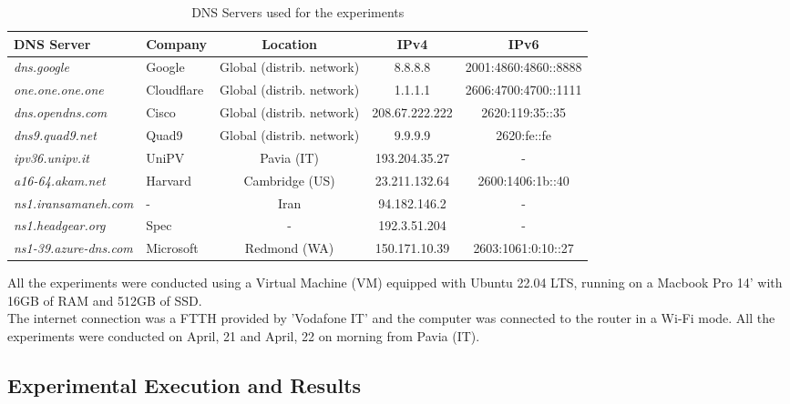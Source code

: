 \documentclass[a4paper,10pt]{article}
\begin{document}
\begin{multicols}{2}
        \FloatBarrier
        \begin{table}[htbp]      
                \centering
                \caption[\small DNS Servers used for the experiments]{\small DNS Servers used for the experiments}
                \vspace{0.3cm}
                \begin{tabular}{|l|l|c|c|c|}
                \hline
                \textbf{DNS Server} & \textbf{Company} & \textbf{Location} & \textbf{IPv4} & \textbf{IPv6} \\ \hline
                \textit{dns.google} & Google & Global (distrib. network) & 8.8.8.8 & 2001:4860:4860::8888 \\ \hline
                \textit{one.one.one.one} & Cloudflare & Global (distrib. network) & 1.1.1.1 & 2606:4700:4700::1111 \\ \hline
                \textit{dns.opendns.com} & Cisco & Global (distrib. network) & 208.67.222.222 & 2620:119:35::35 \\ \hline
                \textit{dns9.quad9.net} & Quad9 & Global (distrib. network) & 9.9.9.9 & 2620:fe::fe \\ \hline
                \textit{ipv36.unipv.it} & UniPV & Pavia (IT) & 193.204.35.27 & - \\ \hline 
                \textit{a16-64.akam.net} & Harvard & Cambridge (US) & 23.211.132.64 & 2600:1406:1b::40 \\ \hline
                \textit{ns1.iransamaneh.com} & - & Iran & 94.182.146.2 & - \\ \hline
                \textit{ns1.headgear.org} & Spec & - & 192.3.51.204 & - \\ \hline
                \textit{ns1-39.azure-dns.com} & Microsoft & Redmond (WA) & 150.171.10.39 & 2603:1061:0:10::27 \\ \hline
                \end{tabular}
                \label{tab:dns_servers}
        \end{table}
\noindent
All the experiments were conducted using a Virtual Machine (VM) equipped with Ubuntu 22.04 LTS, running on a Macbook Pro 14' with 16GB of RAM and 512GB of SSD.\\
The internet connection was a FTTH provided by 'Vodafone IT' and the computer was connected to the router in a Wi-Fi mode. All the experiments were conducted on April, 21 and April, 22 on morning
from Pavia (IT).

\subsection{Experimental Execution and Results}


\end{multicols}
\end{document}

